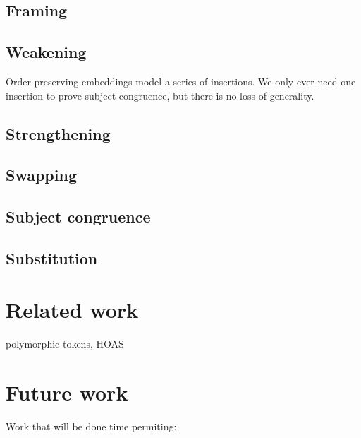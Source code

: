\documentclass[a4paper,UKenglish,cleveref, autoref, thm-restate,authorcolumns]{lipics-v2019}
\begin{document}
\subsection{Framing}


\subsection{Weakening}

Order preserving embeddings model a series of insertions. We only ever need one insertion to prove subject congruence, but there is no loss of generality.

\subsection{Strengthening}

\subsection{Swapping}

\subsection{Subject congruence}\label{subject-congruence}

\subsection{Substitution}

\section{Related work}

\cite{previous-work} polymorphic tokens, HOAS

\cite{typing-with-leftovers}

\cite{Higher-inductive-types-for-congruence}

\cite{LTS-semantics}

\cite{work-on-session-types}


\section{Future work}

Work that will be done time permiting:
\end{document}
